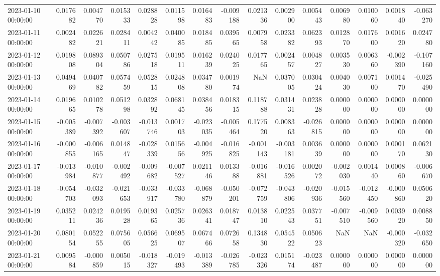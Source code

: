 \begin{tabular}{lrrrrrrrrrrrrrr}
2023-01-10 00:00:00 & 0.017682 & 0.004770 & 0.015333 & 0.028828 & 0.011598 & 0.016483 & -0.009188 & 0.021336 & 0.002900 & 0.005443 & 0.006980 & 0.010060 & 0.001840 & -0.063270 \\
2023-01-11 00:00:00 & 0.002482 & 0.022621 & 0.028411 & 0.004242 & 0.040085 & 0.018485 & 0.039565 & 0.007958 & 0.023382 & 0.062393 & 0.012870 & 0.017600 & 0.001620 & 0.024780 \\
2023-01-12 00:00:00 & 0.019808 & 0.089304 & 0.050786 & 0.027518 & 0.019511 & 0.016239 & 0.024025 & 0.017765 & 0.002457 & 0.004827 & 0.003530 & 0.006360 & -0.002390 & -0.107160 \\
2023-01-13 00:00:00 & 0.049469 & 0.040782 & 0.057459 & 0.052815 & 0.024808 & 0.034780 & 0.001974 & NaN & 0.037005 & 0.030424 & 0.004030 & 0.007100 & 0.001470 & -0.025490 \\
2023-01-14 00:00:00 & 0.019665 & 0.010278 & 0.051298 & 0.032892 & 0.068145 & 0.038456 & 0.018315 & 0.118788 & 0.031431 & 0.023828 & 0.000000 & 0.000000 & 0.000000 & 0.000000 \\
2023-01-15 00:00:00 & -0.005389 & -0.007392 & -0.003607 & -0.013746 & 0.001703 & -0.023035 & -0.005464 & 0.177520 & 0.008363 & -0.026815 & 0.000000 & 0.000000 & 0.000000 & 0.000000 \\
2023-01-16 00:00:00 & -0.000855 & -0.006165 & 0.014847 & -0.028339 & 0.015656 & -0.004925 & -0.016825 & -0.001143 & -0.003181 & 0.003639 & 0.000000 & 0.000000 & 0.000170 & 0.062130 \\
2023-01-17 00:00:00 & -0.013984 & -0.010877 & -0.002492 & -0.009682 & -0.007527 & 0.021146 & 0.013388 & -0.016881 & -0.016526 & 0.002072 & -0.002030 & 0.001440 & 0.000860 & -0.006670 \\
2023-01-18 00:00:00 & -0.054703 & -0.032093 & -0.021653 & -0.033917 & -0.033780 & -0.068879 & -0.050201 & -0.072759 & -0.043806 & -0.020936 & -0.015560 & -0.012450 & -0.000860 & 0.050620 \\
2023-01-19 00:00:00 & 0.035211 & 0.024236 & 0.019528 & 0.019365 & 0.025736 & 0.026341 & 0.018747 & 0.013810 & 0.022543 & 0.037751 & -0.007510 & -0.009560 & 0.003920 & 0.008850 \\
2023-01-20 00:00:00 & 0.080154 & 0.052255 & 0.075605 & 0.056625 & 0.069507 & 0.067466 & 0.072658 & 0.134830 & 0.054522 & 0.050623 & NaN & NaN & -0.000320 & -0.032650 \\
2023-01-21 00:00:00 & 0.009584 & -0.000859 & 0.005015 & -0.018327 & -0.019493 & -0.013389 & -0.026785 & -0.023326 & 0.015174 & -0.023487 & 0.000000 & 0.000000 & 0.000000 & 0.000000 \\

\end{tabular}
